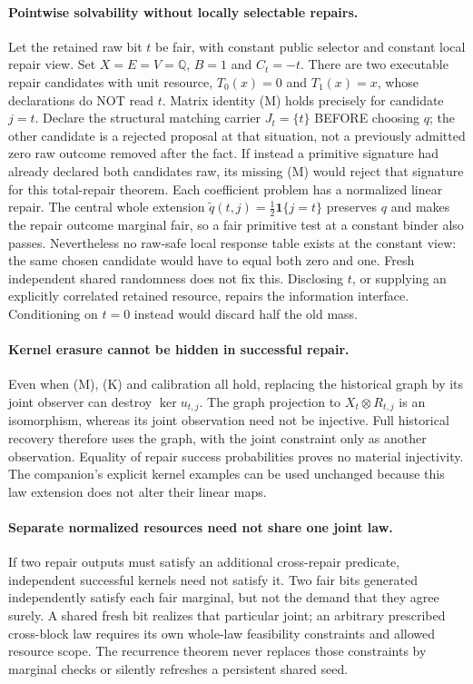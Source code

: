 \documentclass[11pt]{article}
\begin{document}
\paragraph{Pointwise solvability without locally selectable repairs.}
Let the retained raw bit $t$ be fair, with constant public selector and constant local repair view. Set $X=E=V=\mathbb Q$, $B=1$ and $C_t=-t$. There are two executable repair candidates with unit resource, $T_0(x)=0$ and $T_1(x)=x$, whose declarations do NOT read $t$. Matrix identity (M) holds precisely for candidate $j=t$. Declare the structural matching carrier $J_t=\{t\}$ BEFORE choosing $q$; the other candidate is a rejected proposal at that situation, not a previously admitted zero raw outcome removed after the fact. If instead a primitive signature had already declared both candidates raw, its missing (M) would reject that signature for this total-repair theorem. Each coefficient problem has a normalized linear repair. The central whole extension $\widetilde q(t,j)=\frac12\mathbf1\{j=t\}$ preserves $q$ and makes the repair outcome marginal fair, so a fair primitive test at a constant binder also passes. Nevertheless no raw-safe local response table exists at the constant view: the same chosen candidate would have to equal both zero and one. Fresh independent shared randomness does not fix this. Disclosing $t$, or supplying an explicitly correlated retained resource, repairs the information interface. Conditioning on $t=0$ instead would discard half the old mass.

\paragraph{Kernel erasure cannot be hidden in successful repair.}
Even when (M), (K) and calibration all hold, replacing the historical graph by its joint observer can destroy $\ker u_{t,j}$. The graph projection to $X_t\otimes R_{t,j}$ is an isomorphism, whereas its joint observation need not be injective. Full historical recovery therefore uses the graph, with the joint constraint only as another observation. Equality of repair success probabilities proves no material injectivity. The companion's explicit kernel examples can be used unchanged because this law extension does not alter their linear maps.

\paragraph{Separate normalized resources need not share one joint law.}
If two repair outputs must satisfy an additional cross-repair predicate, independent successful kernels need not satisfy it. Two fair bits generated independently satisfy each fair marginal, but not the demand that they agree surely. A shared fresh bit realizes that particular joint; an arbitrary prescribed cross-block law requires its own whole-law feasibility constraints and allowed resource scope. The recurrence theorem never replaces those constraints by marginal checks or silently refreshes a persistent shared seed.
\end{document}
